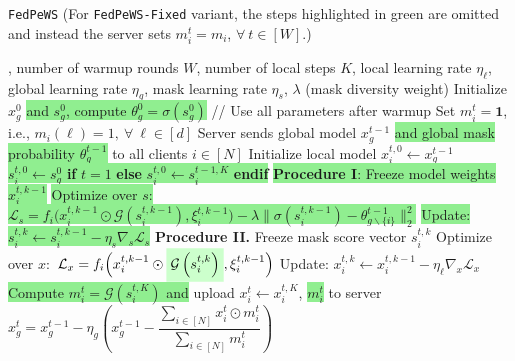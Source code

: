 \begin{algorithm}[t]
    \caption{\texttt{FedPeWS} (For \texttt{FedPeWS-Fixed} variant, the steps highlighted in green are omitted and instead the server sets $m_i^{t} = m_i$, $\forall~t \in [W]$.)} 
    \renewcommand{\algorithmicrequire}{\textbf{Input:}}
    \renewcommand{\algorithmicensure}{\textbf{Return}} 
    \begin{algorithmic}[1] 
        , number of warmup rounds $W$, number of local steps $K$, local learning rate $\eta_{\ell}$, global learning rate $\eta_g$, mask learning rate $\eta_s$, $\lambda$ (mask diversity weight) 
        \State Initialize $x_g^0$ \colorbox{lightgreen}{and $s_g^0$, compute $\theta_g^0 = \sigma(s_g^0)$} 
             // Use all parameters after warmup 
                \State Set $m_i^t = \mathbf{1}$, i.e., $m_i(\ell) = 1, ~ \forall ~ \ell \in [d]$ 
            \EndIf 
            \State Server sends global model $x_g^{t-1}$ \colorbox{lightgreen}{and global mask probability $\theta_g^{t-1}$} to all clients $i \in [N]$ 
                \State Initialize local model $x_{i}^{t,0} \gets x_g^{t-1}$  
                \State \colorbox{lightgreen}{$s_i^{t,0} \gets s_g^0$ \textbf{if } $t=1$ \textbf{else } $s_i^{t,0} \gets s_i^{t-1,K}$ \textbf{endif}} 
                    \State \colorbox{lightgreen}{\textbf{Procedure I}: Freeze model weights $x_{i}^{t,k-1}$}
                    \State \colorbox{lightgreen}{Optimize over $s$: $\mathcal{L}_s = f_i\Big(x_i^{t,k-1} \odot \mathcal{G}\left(s_i^{t,k-1}\right), \xi_i^{t,k-1}\Big) - \lambda \|\sigma\left(s_{i}^{t,k-1}\right) - {\theta_{g \backslash \{i\}}^{t-1}}\|_2^2$} 
                    \State \colorbox{lightgreen}{Update: $s_{i}^{t,k} \gets s_{i}^{t,k-1} - \eta_s \nabla_{s} \mathcal{L}_s$}
                    \State \textbf{Procedure II.} Freeze mask score vector $s_{i}^{t,k}$ 
                    \State Optimize over $x:$ $\mathcal{L}_x = f_i\Big(x_i^{t,k-1} \odot \text{\colorbox{lightgreen}{$\mathcal{G}\left(s_i^{t,k}\right)$}}, \xi_i^{t,k-1}\Big)$ 
                    \State Update: $x_{i}^{t,k} \gets x_{i}^{t,k-1} - \eta_{\ell} \nabla_{x} \mathcal{L}_x$ 
                \EndFor
                \State \colorbox{lightgreen}{Compute $m_i^{t} = \mathcal{G}(s_i^{t,K})$ and} upload $x_{i}^{t} \gets x_{i}^{t,K}$, \colorbox{lightgreen}{$m_i^{t}$} to server  
            \EndFor
            \State $x_g^{t} = x_g^{t-1} -  \eta_g \left(x_g^{t-1} - \dfrac{\sum_{i \in [N]}x_{i}^{t} \odot m_i^{t}}{\sum_{i \in [N]}m_i^{t}}\right)$ 
        \EndFor
    \end{algorithmic}
    \label{algorithm: adaptivesubnet}
\end{algorithm} 